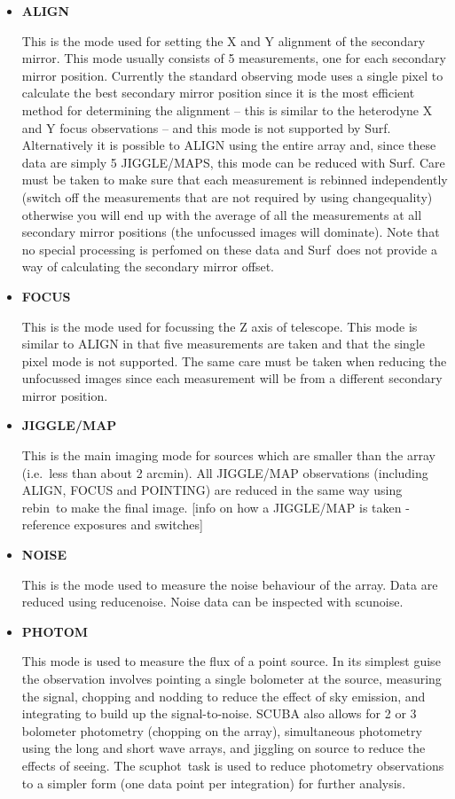 \documentclass[twoside,11pt]{article}
\newcommand{\scusoft}          {{\sc Surf}}
\newcommand{\task}[1]{{\sf #1}}
\newcommand{\renoise}{\htmlref{\task{reduce\_noise}}{REDUCE_NOISE}}
\newcommand{\rebin}{\htmlref{\task{rebin}}{REBIN}}
\newcommand{\chgqual}{\htmlref{\task{change\_quality}}{CHANGE_QUALITY}}
\newcommand{\scuphot}{\htmlref{\task{scuphot}}{SCUPHOT}}
\newcommand{\scunoise}{\htmlref{\task{scunoise}}{SCUNOISE}}
\newcommand{\htmlref}[2]{#1}
\renewcommand{\_}{\texttt{\symbol{95}}}
\begin{document}
\begin{itemize}

\item {\bf ALIGN} 

This is the mode used for setting the X and Y alignment of the secondary
mirror. This mode usually consists of 5 measurements, one for each secondary
mirror position. Currently the standard observing mode uses a single pixel to
calculate the best secondary mirror position since it is the most efficient
method for determining the alignment -- this is similar to the heterodyne X
and Y focus observations -- and this mode is not supported by \scusoft. 
Alternatively it is possible to ALIGN using the entire array and,
since these data are simply 5 JIGGLE/MAPS, this mode can be reduced with
\scusoft.  Care must be taken to make sure that each measurement is rebinned
independently (switch off the measurements that are not required by using
\chgqual) otherwise you will end up with the average of all the measurements
at all secondary mirror positions (the unfocussed images will dominate). Note
that no special processing is perfomed on these data and \scusoft\ does not
provide a way of calculating the secondary mirror offset.

\item {\bf FOCUS}

This is the mode used for focussing the Z axis of telescope. This mode is
similar to ALIGN in that five measurements are taken and that the single pixel
mode is not supported. The same care must be taken when reducing the 
unfocussed images since each measurement will be from a different secondary
mirror position.

\item {\bf JIGGLE/MAP}

This is the main imaging mode for sources which are smaller than the array
(i.e.\ less than about 2 arcmin). All JIGGLE/MAP observations (including
ALIGN, FOCUS and POINTING) are reduced in the same way using \rebin\ to
make the final image. [info on how a JIGGLE/MAP is taken - reference exposures
and switches]

\item {\bf NOISE}

This is the mode used to measure the noise behaviour of the array. Data
are reduced using \renoise. Noise data can be inspected with \scunoise.

\item {\bf PHOTOM}

This mode is used to measure the flux of a point source. In its simplest guise
the observation involves pointing a single bolometer at the source, measuring
the signal, chopping and nodding to reduce the effect of sky emission, and
integrating to build up the signal-to-noise. SCUBA also allows for 2 or 3
bolometer photometry (chopping on the array), simultaneous photometry using
the long and short wave arrays, and jiggling on source to reduce the effects
of seeing. The \scuphot\ task is used to reduce photometry observations
to a simpler form (one data point per integration) for further analysis.


\end{itemize}
\end{document}
